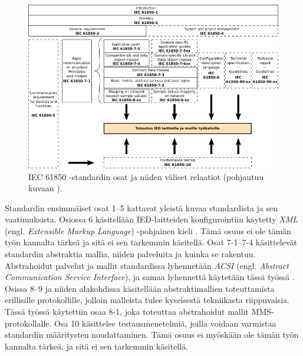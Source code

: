\begin{figure}[ht!]
	\includegraphics[width=1\textwidth]{pictures/iec61850-series-parts-and-relations.png}
	\caption{IEC 61850 -standardin osat ja niiden väliset relaatiot (pohjautuu kuvaan \mbox{\cite[s.~14]{IEC61850-7-1}}).}
	\label{fig:iec61850-osat-ja-relaatiot}
\end{figure}

Standardin ensimmäiset osat 1--5 kattavat yleistä kuvaa standardista ja sen vaatimuksista. Osiossa 6 käsitellään IED-laitteiden konfigurointiin käytetty \emph{XML} (engl. \emph{Extensible Markup Language}) -pohjainen kieli \mbox{\cite[s.~7--8]{IEC61850-6}}. Tämä osuus ei ole tämän työn kannalta tärkeä ja sitä ei sen tarkemmin käsitellä. Osat 7-1--7-4 käsittelevät standardin abstraktia mallia, niiden palveluita ja kuinka se rakentuu. Abstrahoidut palvelut ja mallit standardissa lyhennetään \emph{ACSI} (engl. \emph{Abstract Communication Service Interface}), ja samaa lyhennettä käytetään tässä työssä \mbox{\cite[s.~72]{IEC61850-7-1}}. Osissa 8--9 ja niiden alakohdissa käsitellään abstraktimallien toteuttamista erillisille protokollille, jolloin malleista tulee kyseisestä tekniikasta riippuvaisia. Tässä työssä käytettiin osaa 8-1, joka toteuttaa abstrahoidut mallit MMS-protokollalle. Osa 10 käsittelee testausmenetelmiä, joilla voidaan varmistaa standardin määritysten noudattaminen. Tämä osuus ei myöskään ole tämän työn kannalta tärkeä, ja sitä ei sen tarkemmin käsitellä. \mbox{\cite[s.~15]{IEC61850-7-1}}


